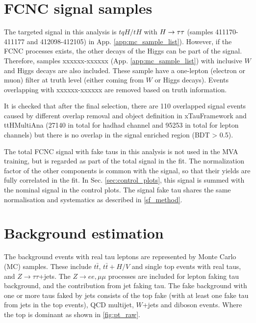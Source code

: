 \section{FCNC signal samples}
\label{sec:fcncbkg}

The targeted signal in this analysis is $tqH/tH$ with $H \rightarrow \tau\tau$ (samples 411170-411177 and 412098-412105) in App. \ref{app:mc_sample_list}).
However, if the FCNC processes exists, the other decays of the Higgs can be part of the signal.
Therefore, samples xxxxxx-xxxxxx (App. \ref{app:mc_sample_list}) with inclusive $W$ and Higgs decays are also included. These sample have a one-lepton (electron or muon) filter at truth level (either coming from $W$ or Higgs decays). Events overlapping with xxxxxx-xxxxxx are removed based on truth information.

It is checked that after the final selection, there are 110 overlapped signal events caused by different overlap removal and object definition in xTauFramework and ttHMultiAna (27140 in total for hadhad channel and 95253 in total for lepton channels) but there is no overlap in the signal enriched region (BDT > 0.5).

The total FCNC signal with fake taus in this analysis is not used in the MVA training, but is regarded as part of the total signal in the fit. The normalization factor of the other components is common with the signal, so that their yields are fully correlated in the fit. In Sec. \ref{sec:control_plots}, this signal is summed with the nominal signal in the control plots. The signal fake tau shares the same normalisation and systematics as described in \ref{sf_method}.

\section{Background estimation}
\label{sec:background}

The background events with real tau leptons are represented by Monte Carlo (MC) samples. These include $t\bar{t}$, $t\bar{t}+H/V$ and 
single top events with real taus, and $Z\to\tau\tau$+jets. The $Z\to ee,\mu\mu$ processes are included for lepton faking 
tau background, and the contribution from jet faking tau.
The fake background with one or more taus faked by jets consists of the top fake (with at least one fake tau from jets in the top events), 
QCD multijet, $W$+jets and diboson events. Where the top is dominant as shown in \ref{fig:pt_raw}.

